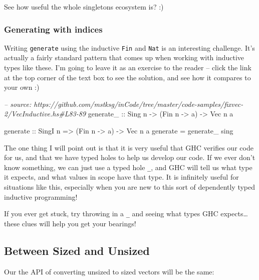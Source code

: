 \documentclass[]{article}
\newenvironment{Shaded}{}{}
\newcommand{\DataTypeTok}[1]{\textcolor[rgb]{0.56,0.13,0.00}{#1}}
\newcommand{\CommentTok}[1]{\textcolor[rgb]{0.38,0.63,0.69}{\textit{#1}}}
\newcommand{\OtherTok}[1]{\textcolor[rgb]{0.00,0.44,0.13}{#1}}
\newcommand{\FunctionTok}[1]{\textcolor[rgb]{0.02,0.16,0.49}{#1}}
\newcommand{\NormalTok}[1]{#1}
\begin{document}
See how useful the whole singletons ecosystem is? :)

\subsubsection{Generating with indices}\label{generating-with-indices-1}

Writing \texttt{generate} using the inductive \texttt{Fin} and \texttt{Nat} is
an interesting challenge. It's actually a fairly standard pattern that comes up
when working with inductive types like these. I'm going to leave it as an
exercise to the reader -- click the link at the top corner of the text box to
see the solution, and see how it compares to your own :)

\begin{Shaded}
\begin{Highlighting}[]
\CommentTok{-- source: https://github.com/mstksg/inCode/tree/master/code-samples/fixvec-2/VecInductive.hs#L83-89}
\OtherTok{generate_ ::} \DataTypeTok{Sing}\NormalTok{ n }\OtherTok{->}\NormalTok{ (}\DataTypeTok{Fin}\NormalTok{ n }\OtherTok{->}\NormalTok{ a) }\OtherTok{->} \DataTypeTok{Vec}\NormalTok{ n a}

\OtherTok{generate ::} \DataTypeTok{SingI}\NormalTok{ n }\OtherTok{=>}\NormalTok{ (}\DataTypeTok{Fin}\NormalTok{ n }\OtherTok{->}\NormalTok{ a) }\OtherTok{->} \DataTypeTok{Vec}\NormalTok{ n a}
\NormalTok{generate }\FunctionTok{=}\NormalTok{ generate_ sing}
\end{Highlighting}
\end{Shaded}

The one thing I will point out is that it is very useful that GHC verifies our
code for us, and that we have typed holes to help us develop our code. If we
ever don't know something, we can just use a typed hole \texttt{\_}, and GHC
will tell us what type it expects, and what values in scope have that type. It
is infinitely useful for situations like this, especially when you are new to
this sort of dependently typed inductive programming!

If you ever get stuck, try throwing in a \texttt{\_} and seeing what types GHC
expects\ldots{}these clues will help you get your bearings!

\subsection{Between Sized and Unsized}\label{between-sized-and-unsized}

Our the API of converting unsized to sized vectors will be the same:
\end{document}
